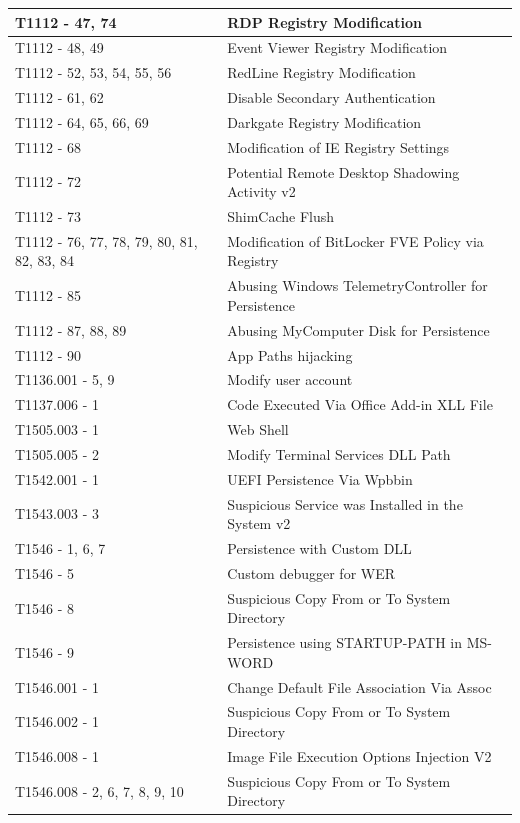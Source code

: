 \begin{longtable}{|>{\raggedright\arraybackslash}p{5.2cm}|>{\raggedright\arraybackslash}p{9.0cm}|}
T1112 - 47, 74 & RDP Registry Modification \\ \hline
T1112 - 48, 49 & Event Viewer Registry Modification \\ \hline
T1112 - 52, 53, 54, 55, 56 & RedLine Registry Modification \\ \hline
T1112 - 61, 62 & Disable Secondary Authentication \\ \hline
T1112 - 64, 65, 66, 69 & Darkgate Registry Modification \\ \hline
T1112 - 68 & Modification of IE Registry Settings \\ \hline
T1112 - 72 & Potential Remote Desktop Shadowing Activity v2 \\ \hline
T1112 - 73 & ShimCache Flush \\ \hline
T1112 - 76, 77, 78, 79, 80, 81, 82, 83, 84 & Modification of BitLocker FVE Policy via Registry \\ \hline
T1112 - 85 & Abusing Windows TelemetryController for Persistence \\ \hline
T1112 - 87, 88, 89 & Abusing MyComputer Disk for Persistence \\ \hline
T1112 - 90 & App Paths hijacking \\ \hline
T1136.001 - 5, 9 & Modify user account \\ \hline
T1137.006 - 1 & Code Executed Via Office Add-in XLL File \\ \hline
T1505.003 - 1 & Web Shell \\ \hline
T1505.005 - 2 & Modify Terminal Services DLL Path \\ \hline
T1542.001 - 1 & UEFI Persistence Via Wpbbin \\ \hline
T1543.003 - 3 & Suspicious Service was Installed in the System v2 \\ \hline
T1546 - 1, 6, 7 & Persistence with Custom DLL \\ \hline
T1546 - 5 & Custom debugger for WER \\ \hline
T1546 - 8 & Suspicious Copy From or To System Directory \\ \hline
T1546 - 9 & Persistence using STARTUP-PATH in MS-WORD \\ \hline
T1546.001 - 1 & Change Default File Association Via Assoc \\ \hline
T1546.002 - 1 & Suspicious Copy From or To System Directory \\ \hline
T1546.008 - 1 & Image File Execution Options Injection V2 \\ \hline
T1546.008 - 2, 6, 7, 8, 9, 10 & Suspicious Copy From or To System Directory \\ \hline

\end{longtable}
